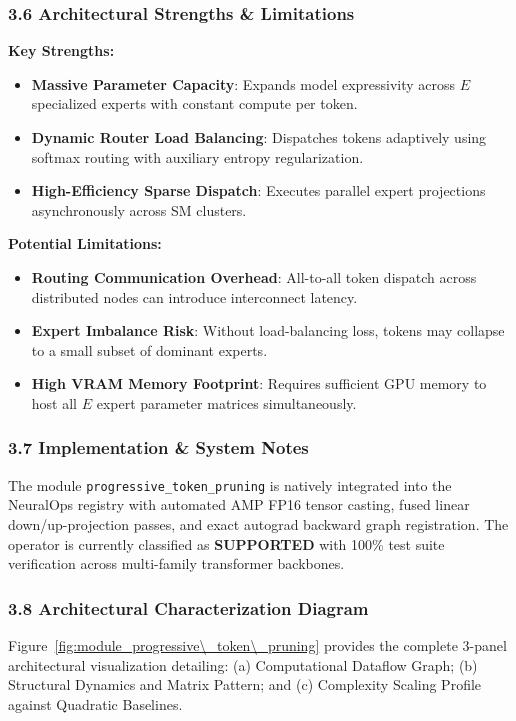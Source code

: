 \subsubsection*{3.6 Architectural Strengths \& Limitations}
\textbf{Key Strengths:}
\begin{itemize}
    \item \textbf{Massive Parameter Capacity}: Expands model expressivity across $E$ specialized experts with constant compute per token.
    \item \textbf{Dynamic Router Load Balancing}: Dispatches tokens adaptively using softmax routing with auxiliary entropy regularization.
    \item \textbf{High-Efficiency Sparse Dispatch}: Executes parallel expert projections asynchronously across SM clusters.
\end{itemize}

\textbf{Potential Limitations:}
\begin{itemize}
    \item \textbf{Routing Communication Overhead}: All-to-all token dispatch across distributed nodes can introduce interconnect latency.
    \item \textbf{Expert Imbalance Risk}: Without load-balancing loss, tokens may collapse to a small subset of dominant experts.
    \item \textbf{High VRAM Memory Footprint}: Requires sufficient GPU memory to host all $E$ expert parameter matrices simultaneously.
\end{itemize}

\subsubsection*{3.7 Implementation \& System Notes}
The module \texttt{progressive\_token\_pruning} is natively integrated into the NeuralOps registry with automated AMP FP16 tensor casting, fused linear down/up-projection passes, and exact autograd backward graph registration. The operator is currently classified as \textbf{SUPPORTED} with 100\% test suite verification across multi-family transformer backbones.

\subsubsection*{3.8 Architectural Characterization Diagram}
Figure~\ref{fig:module_progressive\_token\_pruning} provides the complete 3-panel architectural visualization detailing: (a) Computational Dataflow Graph; (b) Structural Dynamics and Matrix Pattern; and (c) Complexity Scaling Profile against Quadratic Baselines.

